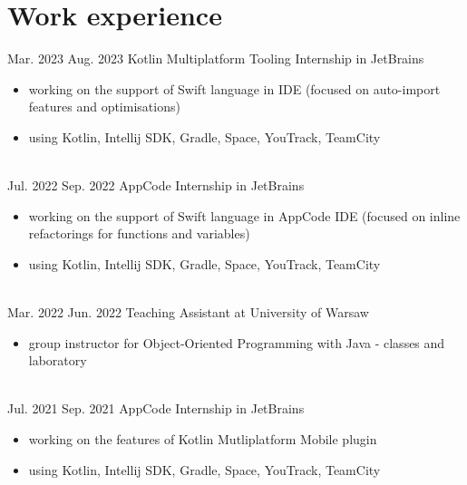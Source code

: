 \documentclass[a4paper]{twentysecondcv} %
\begin{document}
    \makeprofile %

    \vspace{-0.3cm}


    \section{Work experience}
    \begin{twenty}
        \twentyitem
        {Mar. 2023}
        {Aug. 2023}
        {Kotlin Multiplatform Tooling Internship in JetBrains}
        {}
        {}
        {\begin{itemize}
             \item working on the support of Swift language in IDE (focused on auto-import features and optimisations)
             \item using Kotlin, Intellij SDK, Gradle, Space, YouTrack, TeamCity
        \end{itemize}
        }
        \\
        \twentyitem
        {Jul. 2022}
        {Sep. 2022}
        {AppCode Internship in JetBrains}
        {}
        {}
        {\begin{itemize}
             \item working on the support of Swift language in AppCode IDE (focused on inline refactorings for functions and variables)
             \item using Kotlin, Intellij SDK, Gradle, Space, YouTrack, TeamCity
        \end{itemize}
        }
        \\
        \twentyitem
        {Mar. 2022}
        {Jun. 2022}
        {Teaching Assistant at University of Warsaw}
        {}
        {}
        {\begin{itemize}
             \item group instructor for Object-Oriented Programming with Java - classes and laboratory
        \end{itemize}
        }
        \\
        \twentyitem
        {Jul. 2021}
        {Sep. 2021}
        {AppCode Internship in JetBrains}
        {}
        {}
        {\begin{itemize}
             \item working on the features of Kotlin Mutliplatform Mobile plugin
             \item using Kotlin, Intellij SDK, Gradle, Space, YouTrack, TeamCity
        \end{itemize}
}
\end{twenty}
\end{document}

